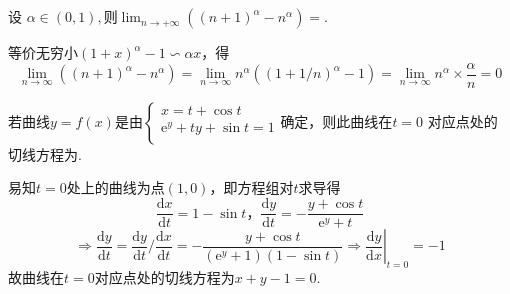 \documentclass[hideanswer=false,
	enfont=newtxtext,
	zhfont=empty,
	mathfont=newtxmath,
]{cmcthesis}
\begin{document}

\addvspace{1\bigskipamount}

\\\\
\wq 设 $\alpha\in\left(0,1\right),\textrm{则} \lim_{n\rightarrow +\infty}\left(\left(n+1\right)^{\alpha}-n^{\alpha}\right)=$\underline{\hspace{3em}}.\\
	\begin{answer}
	\begin{solution}
等价无穷小$\left(1+x\right)^{\alpha}-1\backsim\alpha x$，得
		\[
		\lim_{n\rightarrow\infty}\left(\left(n+1\right)^{\alpha}-n^{\alpha}\right)=\lim_{n\rightarrow\infty}n^{\alpha}\left(\left(1+1/n\right)^{\alpha}-1\right)=\lim_{n\rightarrow\infty}n^{\alpha}\times\frac{\alpha}{n}=0
		\]
	\end{solution}
	\end{answer}
\wq $\textrm{若曲线}y=f\left(x\right)\textrm{是由}\left\{\begin{array}{l}
x=t+\cos t\\
\mathrm{e}^y+ty+\sin t=1\\
\end{array}\right.\textrm{确定，则此曲线在}t=0$ 对应点处的\\
切线方程为\underline{\hspace{3em}}.\\
	\begin{answer}
	\begin{solution}
易知$t=0$处上的曲线为点$(1,0)$，即方程组对$t$求导得
	\[
	\frac{\mathrm{d}x}{\mathrm{d}t}=1-\sin t\textbf{，}\frac{\mathrm{d}y}{\mathrm{d}t}=-\frac{y+\cos t}{\mathrm{e}^y+t}
	\]
	\[
	\Rightarrow\frac{\mathrm{d}y}{\mathrm{d}t}=\frac{\mathrm{d}y}{\mathrm{d}t}/\frac{\mathrm{d}x}{\mathrm{d}t}=-\frac{y+\cos t}{\left(\mathrm{e}^y+1\right)\left(1-\sin t\right)}\Rightarrow\left. \frac{\mathrm{d}y}{\mathrm{d}x}\right| _{t=0}=-1
	\]
故曲线在$t=0$对应点处的切线方程为$x+y-1=0$.
	\end{solution}
	\end{answer}
\end{document}
